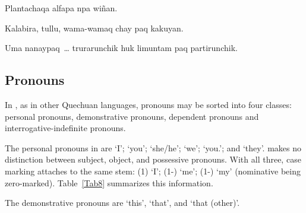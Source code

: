 %
{Plantachaqa alfapa npa wiñan.}%
{}%
{}{}%

%
{Kalabira, tullu, wama-wamaq chay paq kakuyan.}%
{}%
{}{}%

%
{Uma nanaypaq~\dots{} trurarunchik huk limuntam paq partirunchik.}%
{}%
{}{}%

\subsection{Pronouns}
In \SYQ, as in other Quechuan languages, pronouns may be sorted into four classes: personal pronouns, demonstrative pronouns, dependent pronouns and interroga\-tive-indefinite pronouns.

The personal pronouns in \SYQ{} are  ‘I’;  ‘you’;  ‘she/he’;  ‘we’;  ‘you.’; and  ‘they’. \SYQ{} makes no distinction between subject, object, and possessive pronouns. With all three, case marking attaches to the same stem:  (1) ‘I’;  (1-) ‘me’;  (1-) ‘my’ (nominative being zero-marked). Table~\ref{Tab8} summarizes this information.

The demonstrative pronouns are  ‘this’,  ‘that’, and  ‘that (other)’.

